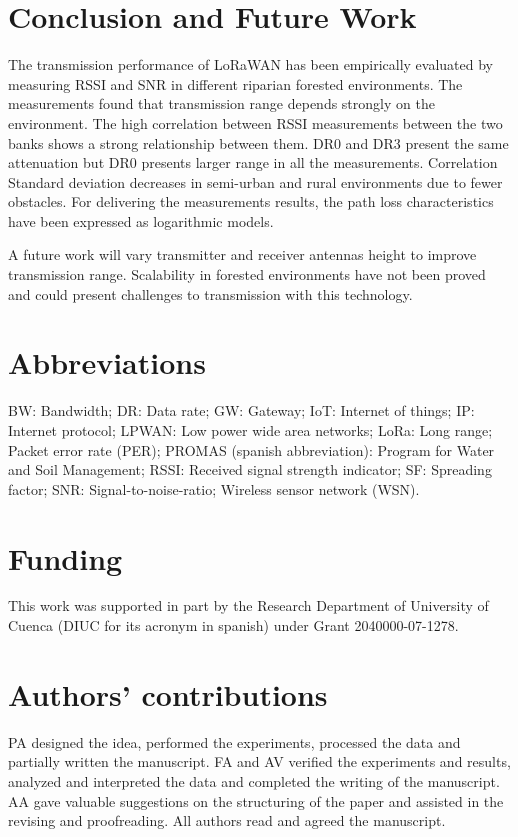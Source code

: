 

\section{Conclusion and Future Work}

The transmission performance of LoRaWAN has been empirically evaluated by measuring RSSI and SNR in different riparian forested environments. The measurements found that transmission range depends strongly on the environment. The high correlation between RSSI measurements between the two banks shows a strong relationship between them. DR$0$ and DR$3$ present the same attenuation but DR$0$ presents larger range in all the measurements. Correlation Standard deviation decreases in semi-urban and rural environments due to fewer obstacles. For delivering the measurements results, the path loss characteristics have been expressed as logarithmic models.

A future work will vary transmitter and receiver antennas height to improve transmission range. Scalability in forested environments have not been proved and could present challenges to transmission with this technology. 

\small 
\section*{Abbreviations}

BW: Bandwidth; DR: Data rate; GW: Gateway; IoT: Internet of things; IP: Internet protocol; LPWAN: Low power wide area networks; LoRa: Long range; Packet error rate (PER); PROMAS (spanish abbreviation): Program for Water and Soil Management; RSSI: Received signal strength indicator; SF: Spreading factor; SNR: Signal-to-noise-ratio;  Wireless sensor network (WSN).

\section*{Funding}

This work was supported in part by the Research Department of University of Cuenca (DIUC for its acronym in spanish) under Grant 2040000-07-1278. 

\section*{Authors’ contributions}

PA designed the idea, performed the experiments, processed the data and partially written the manuscript. FA and AV verified the experiments and results, analyzed and interpreted the data and completed the writing of the manuscript. AA gave valuable suggestions on the structuring of the paper and assisted in the revising and proofreading. All authors read and agreed the manuscript. 


